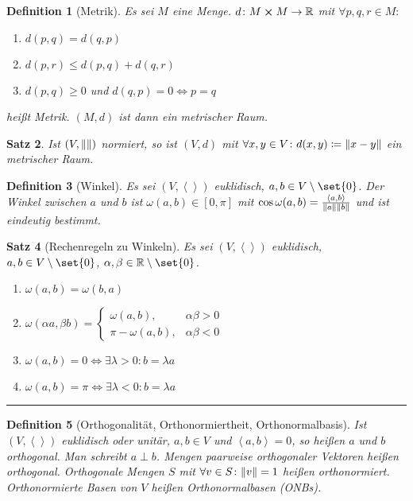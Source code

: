 \documentclass[a4paper]{article}
\newcounter{Sec}
\theoremstyle{marginbreak}
\newtheorem{definition}{Definition}[Sec]
\newtheorem{satz}[definition]{Satz}
\newcommand{\sep}{%
	\rule{\textwidth}{0.3pt}%
	\stepcounter{Sec}%
	}
\newcommand\scp[1]{\left\langle#1\right\rangle}
\begin{document}
	\begin{definition}[Metrik]
		Es sei $M$ eine Menge. $d\colon M\cross M\to\mathbb{R}$ mit $\forall p, q, r\in M\colon$
		\begin{enumerate}[label=(\alph*)]
			\item $d(p, q) = d(q, p)$
			\item $d(p, r) \leq d(p, q) + d(q, r)$
			\item $d(p, q) \geq 0$ und $d(q, p) = 0 \iff p = q$
		\end{enumerate}
		heißt Metrik. $(M, d)$ ist dann ein metrischer Raum.
	\end{definition}
	\begin{satz}
		Ist $(V, \norm{})$ normiert, so ist $(V, d)$ mit $\forall x, y\in V\colon d(x, y)\coloneqq \norm{x - y}$
		ein metrischer Raum.
	\end{satz}
	\begin{definition}[Winkel]
		Es sei $(V, \scp{})$ euklidisch, $a, b\in V\setminus\set{0}$. Der Winkel
		zwischen $a$ und $b$ ist $\omega(a, b)\in[0,\pi]$ mit $\cos\omega(a, b) = \frac{\scp{a, b}}{\norm{a}\norm{b}}$
		und ist eindeutig bestimmt.
	\end{definition}
	\begin{satz}[Rechenregeln zu Winkeln]
		Es sei $(V, \scp{})$ euklidisch, $a, b\in V\setminus\set{0}$, $\alpha, \beta\in\mathbb{R}\setminus\set{0}$.
		\begin{enumerate}[label=(\alph*)]
			\item $\omega(a, b) = \omega(b, a)$
			\item $\omega(\alpha a, \beta b) =
				\begin{cases}
					\omega(a, b), &\alpha\beta > 0\\
					\pi-\omega(a, b), &\alpha\beta < 0
				\end{cases}$
			\item $\omega(a, b) = 0 \iff \exists\lambda > 0\colon b=\lambda a$
			\item $\omega(a, b) = \pi \iff \exists\lambda < 0\colon b=\lambda a$
		\end{enumerate}
	\end{satz}
	\sep
	\begin{definition}[Orthogonalität, Orthonormiertheit, Orthonormalbasis]
		Ist $(V,\scp{})$ euklidisch oder unitär, $a, b\in V$ und $\scp{a, b}=0$,
		so heißen $a$ und $b$ orthogonal. Man schreibt $a\perp b$. Mengen paarweise
		orthogonaler Vektoren heißen orthogonal. Orthogonale Mengen $S$ mit $\forall v\in S\colon \norm{v}=1$
		heißen orthonormiert. Orthonormierte Basen von $V$ heißen Orthonormalbasen (ONBs).
	\end{definition}
\end{document}

